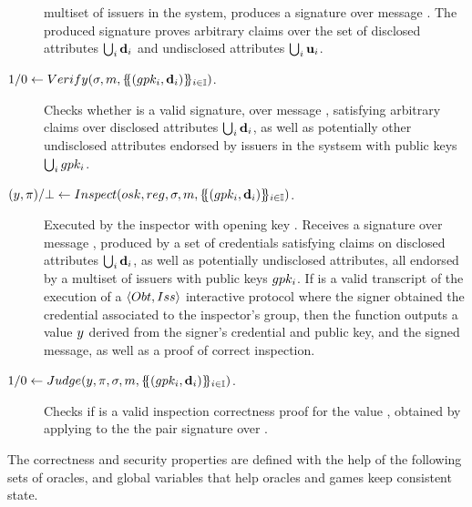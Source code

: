 \begin{description}
  multiset of issuers in the system, produces a signature \sig over message
  \msg. The produced signature proves arbitrary claims over the set of
  disclosed attributes $\bigcup_i \mathbf{d}_i$ and undisclosed attributes
  $\bigcup_i \mathbf{u}_i$.
\item[$1/0 \gets
  Verify(\sigma,m,\{\mskip-5mu\{ (gpk_i,\mathbf{d}_i) \}\mskip-5mu\}_{i \in \mathbb{I}})$.]
  Checks whether \sig is a valid signature, over message \msg, satisfying
  arbitrary claims over disclosed attributes $\bigcup_i \mathbf{d}_i$, as well as
  potentially other undisclosed attributes endorsed by issuers in the systsem
  with public keys $\bigcup_i gpk_i$.
\item[$(y,\pi)/\bot \gets
  Inspect(osk,reg,\sigma,m,
  \{\mskip-5mu\{ (gpk_i,\mathbf{d}_i) \}\mskip-5mu\}_{i \in \mathbb{I}})$.] %
  Executed by the inspector with opening key \osk. Receives a signature \sig
  over message \msg, produced by a set of credentials satisfying claims on
  disclosed attributes $\bigcup_i \mathbf{d}_i$, as well as potentially undisclosed
  attributes, all endorsed by a multiset of issuers with public keys $gpk_i$. 
  If \utrans is a valid transcript of the execution of a
  $\langle Obt,Iss\rangle$ interactive protocol where the signer obtained
  the credential associated to the inspector's group, then the function outputs
  a value $y$ derived from the signer's credential and public key, and the
  signed message, as well as a proof of correct inspection.
\item[$1/0 \gets Judge(y,\pi,\sigma,m,
  \{\mskip-5mu\{ (gpk_i,\mathbf{d}_i)\}\mskip-5mu\}_{i \in \mathbb{I}})$.] %
  Checks if \iproof is a valid inspection correctness proof for the value \y,
  obtained by applying \Inspect to the the pair signature \sig over \msg. 
\end{description}

The correctness and security properties are defined with the help of the
following sets of oracles, and global variables that help oracles and games
keep consistent state.

